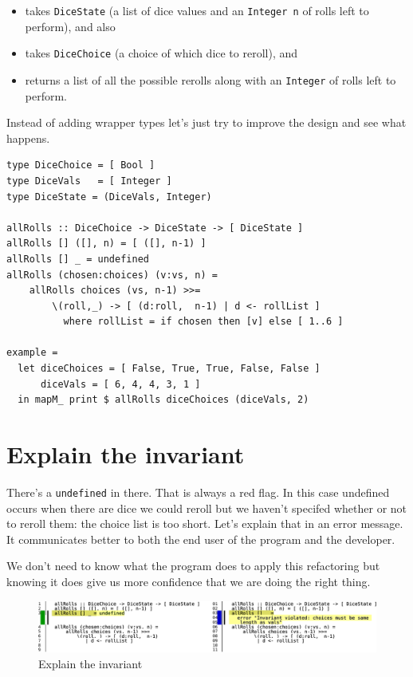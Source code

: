 \begin{itemize}
\item takes \texttt{DiceState} (a list of dice values and an \texttt{Integer n} of rolls left to perform), and also
\item takes \texttt{DiceChoice} (a choice of which dice to reroll), and
\item returns a list of all the possible rerolls along with an \texttt{Integer} of rolls left to perform.
\end{itemize}
Instead of adding wrapper types let's just try to improve the design and see what happens.

\begin{verbatim}
type DiceChoice = [ Bool ]
type DiceVals   = [ Integer ]
type DiceState = (DiceVals, Integer)

allRolls :: DiceChoice -> DiceState -> [ DiceState ]
allRolls [] ([], n) = [ ([], n-1) ]
allRolls [] _ = undefined
allRolls (chosen:choices) (v:vs, n) =
    allRolls choices (vs, n-1) >>=
        \(roll,_) -> [ (d:roll,  n-1) | d <- rollList ]
          where rollList = if chosen then [v] else [ 1..6 ]

example =
  let diceChoices = [ False, True, True, False, False ]
      diceVals = [ 6, 4, 4, 3, 1 ]
  in mapM_ print $ allRolls diceChoices (diceVals, 2)
\end{verbatim}

\section{Explain the invariant}

There's a \texttt{undefined} in there. That is always a red flag. In this case undefined occurs when there are dice we could reroll but we haven't specifed whether or not to reroll them: the choice list is too short. Let's explain that in an error message. It communicates better to both the end user of the program and the developer.

We don't need to know what the program does to apply this refactoring but knowing it does give us more confidence that we are doing the right thing.

\begin{figure}[htbp]
 \centering
 \includegraphics[width=\linewidth]{./pics/diff1.pdf}
 \caption{Explain the invariant}
 \label{fig:diff1}
\end{figure}

